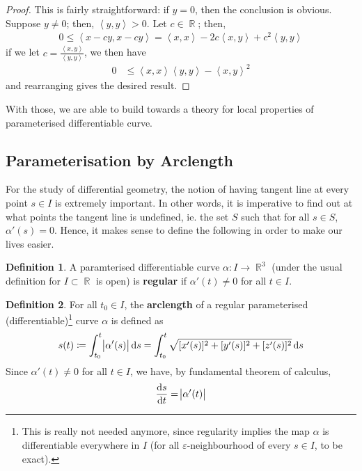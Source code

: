 \documentclass{amsart} %
\renewcommand{\epsilon}{\varepsilon}
\theoremstyle{mytheoremstyle}
\theoremstyle{definition}
\newtheorem{definition}{Definition}[section]
\numberwithin{equation}{section}
\DeclareMathOperator{\R}{\mathbb{R}}
\DeclareMathOperator{\1}{\mathbbm{1}}
\DeclareMathOperator{\D}{\dif}
\renewcommand{\leq}{\leqslant}
\renewcommand{\epsilon}{\varepsilon}
\newcommand{\innerproduct}[2]{\left\langle #1,#2 \right\rangle}
\renewcommand{\leq}{\leqslant}
\renewcommand{\epsilon}{\varepsilon}
\begin{document}
\begin{proof}
	This is fairly straightforward: if $y=0$, then the conclusion is obvious. Suppose $y \neq 0$; then, $\innerproduct{y}{y} >0$. Let $c \in \R$; then,
	\begin{align}
	0 \leq \innerproduct{x-cy}{x-cy} = \innerproduct{x}{x} - 2c \innerproduct{x}{y} + c^2 \innerproduct{y}{y}
	\end{align}
	if we let $c = \frac{\innerproduct{x}{y}}{\innerproduct{y}{y}}$, we then have
	\begin{align*}
	0 &\leq \innerproduct{x}{x} \innerproduct{y}{y} - \innerproduct{x}{y}^2
	\end{align*}
	and rearranging gives the desired result.
\end{proof}


With those, we are able to build towards a theory for local properties of parameterised differentiable curve. 


\subsection{Parameterisation by Arclength}

For the study of differential geometry, the notion of having tangent line at every point $s \in I$ is extremely important. In other words, it is imperative to find out at what points the tangent line is undefined, ie. the set $S$ such that for all $s \in S$, $\alpha'(s) = 0$. Hence, it makes sense to define the following in order to make our lives easier.


\begin{definition}
	\label{defregularcurve}
	A paramterised differentiable curve $\alpha: I \to \R^3$ (under the usual definition for $I \subset \R$ is open) is \textbf{regular} if $\alpha'(t) \neq 0$ for all $t \in I$.
\end{definition}


\begin{definition}
	\label{defarclength}
	For all $t_0 \in I$, the \textbf{arclength} of a regular parameterised (differentiable)\footnote{This is really not needed anymore, since regularity implies the map $\alpha$ is differentiable everywhere in $I$ (for all $\epsilon$-neighbourhood of every $s \in I$, to be exact).} curve $\alpha$ is defined as
	\begin{align*}
	s(t) \coloneqq \int_{t_0}^{t} \abs{\alpha'(s)} \D s = \int_{t_0}^{t} \sqrt{[x'(s)]^2 + [y'(s)]^2 + [z'(s)]^2 }  \D s 
	\end{align*}
	Since $\alpha'(t) \neq 0$ for all $t \in I$, we have, by fundamental theorem of calculus,
	\begin{align*}
	\frac{\D  s}{\D t} = \abs{\alpha'(t)}
	\end{align*}
\end{definition}
\end{document}
